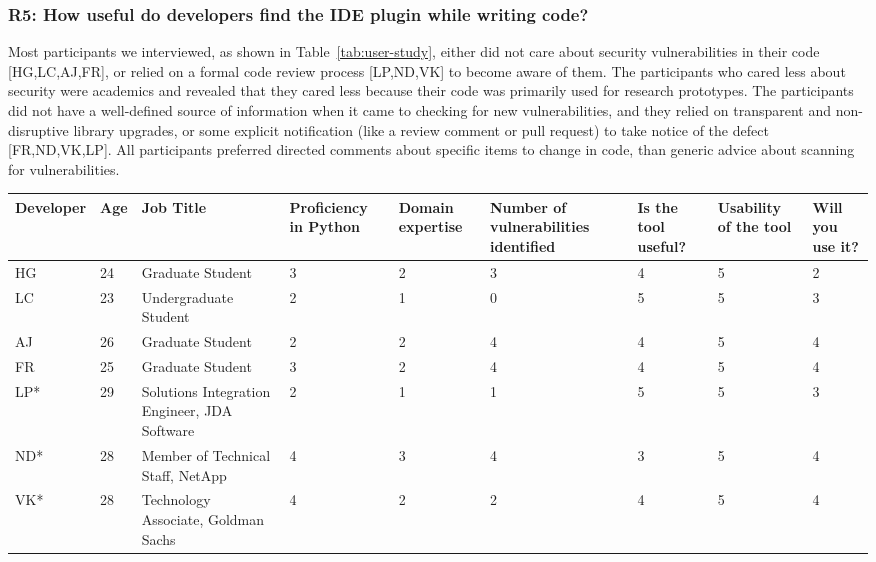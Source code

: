 \subsubsection{R5: How useful do developers find the IDE plugin while writing code?}


Most participants we interviewed, as shown in Table~\ref{tab:user-study}, either did not care about security vulnerabilities in their code [HG,LC,AJ,FR], or relied on a formal code review process [LP,ND,VK] to become aware of them. The participants who cared less about security were academics and revealed that they cared less because their code was primarily used for research prototypes. The participants did not have a well-defined source of information when it came to checking for new vulnerabilities, and they relied on transparent and non-disruptive library upgrades, or some explicit notification (like a review comment or pull request) to take notice of the defect [FR,ND,VK,LP].  All participants preferred directed comments about specific items to change in code, than generic advice about scanning for vulnerabilities. 

\begin{table*}[!h]
\small
  \centering
  \begin{tabular}{|p{}|p{}|p{}|p{}|p{}|p{}|p{}|p{}|p{}|}
    \hline
Developer & Age & Job Title & Proficiency in Python & Domain expertise & Number of vulnerabilities identified & Is the tool useful? & Usability of the tool & Will you use it? \\
\hline
\hline
HG & 24 & Graduate Student & 3 & 2 & 3 & 4 & 5 & 2 \\
\hline
LC & 23 & Undergraduate Student & 2 & 1 & 0 & 5 & 5 & 3 \\
\hline
AJ & 26 & Graduate Student & 2 & 2 & 4 & 4 & 5 & 4 \\
\hline
FR & 25 & Graduate Student & 3 & 2 & 4 & 4 & 5 & 4 \\
\hline
LP* & 29 & Solutions Integration Engineer, JDA Software & 2 & 1 & 1 & 5 & 5 & 3 \\
\hline
ND* & 28 & Member of Technical Staff, NetApp & 4 & 3 & 4 & 3 & 5 & 4 \\
\hline
VK* & 28 & Technology Associate, Goldman Sachs & 4 & 2 & 2 & 4 & 5 & 4 \\
\hline
  \end{tabular}
  \caption{User demographics data. Participants marked with an asterix(*) were interviewed remotely over Skype. The ratings are on a scale of 1 to 5, where 1 is the worst and 5 is the best possible score for that question} 
  \label{tab:user-study}
\end{table*}


